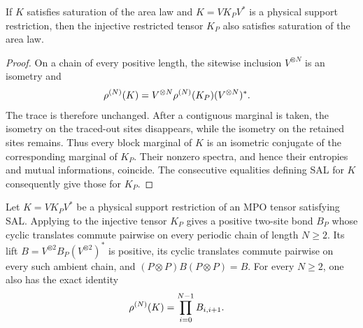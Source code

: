 \begin{lemma}
    \label{thm:mpdo_physical_support_restriction_sal}
    \leanok
    If $K$ satisfies saturation of the area law and
    $K=V K_P V^*$ is a physical support restriction, then the injective
    restricted tensor $K_P$ also satisfies saturation of the area law.
\end{lemma}

\begin{proof}\leanok
    On a chain of every positive length, the sitewise inclusion
    $V^{\otimes N}$ is an isometry and
    \begin{align}
        \rho^{(N)}(K)
         & =V^{\otimes N}\rho^{(N)}(K_P)(V^{\otimes N})^*.
        \notag
    \end{align}
    The trace is therefore unchanged. After a contiguous marginal is
    taken, the isometry on the traced-out sites disappears, while the
    isometry on the retained sites remains. Thus every block marginal of
    $K$ is an isometric conjugate of the corresponding marginal of $K_P$.
    Their nonzero spectra, and hence their entropies and mutual
    informations, coincide. The consecutive equalities defining SAL for
    $K$ consequently give those for $K_P$.
\end{proof}

\begin{lemma}
    \label{thm:mpdo_physical_support_restriction_bond}
    \leanok
    Let $K=V K_P V^*$ be a physical support restriction of an MPO tensor
    satisfying SAL. Applying \cite[Proposition~C.8]{Cirac2016MPDO_arXiv} to the
    injective tensor $K_P$ gives a positive two-site bond $B_P$ whose cyclic
    translates commute pairwise on every periodic chain of length $N\geq 2$. Its
    lift $B=V^{\otimes 2}B_P(V^{\otimes 2})^*$ is positive, its cyclic translates
    commute pairwise on every such ambient chain, and
    $(P\otimes P)B(P\otimes P)=B$.
    For every $N\geq2$, one also has the exact identity
    \begin{align}
        \rho^{(N)}(K)
         & =\prod_{i=0}^{N-1}B_{i,i+1}.
        \notag
    \end{align}
\end{lemma}

